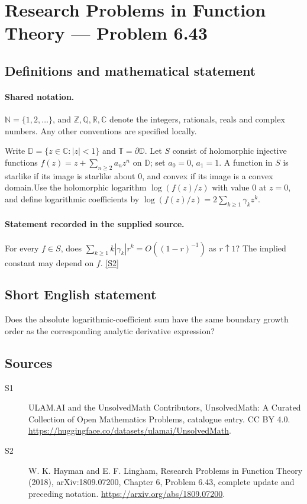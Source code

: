 \documentclass[11pt]{article}
\newcommand{\sref}[2]{\hyperlink{source:#1:#2}{[S#2]}}
\begin{document}
\section{Research Problems in Function Theory — Problem 6.43}\label{statement}

\subsection{Definitions and mathematical statement}

\paragraph{Shared notation.}$\mathbb N=\{1,2,\ldots\}$, and $\mathbb Z,\mathbb Q,\mathbb R,\mathbb C$ denote the integers, rationals, reals and complex numbers. Any other conventions are specified locally.


Write $\mathbb D=\{z\in\mathbb C:|z|<1\}$ and $\mathbb T=\partial\mathbb D$. Let $S$ consist of holomorphic injective functions $f(z)=z+\sum_{n\ge2}a_nz^n$ on $\mathbb D$; set $a_0=0$, $a_1=1$. A function in $S$ is starlike if its image is starlike about $0$, and convex if its image is a convex domain.Use the holomorphic logarithm $\log(f(z)/z)$ with value $0$ at $z=0$, and define logarithmic coefficients by $\log(f(z)/z)=2\sum_{k\ge1}\gamma_kz^k$.
\paragraph{Statement recorded in the supplied source.}
For every $f\in S$, does $\sum_{k\ge1}k|\gamma_k|r^k=O((1-r)^{-1})$ as $r\uparrow1$? The implied constant may depend on $f$. \sref{statement}{2}
\subsection{Short English statement}
Does the absolute logarithmic-coefficient sum have the same boundary growth order as the corresponding analytic derivative expression?
\subsection{Sources}
\begin{description}
\item[\hypertarget{source:statement:1}{S1}] ULAM.AI and the UnsolvedMath Contributors, UnsolvedMath: A Curated Collection of Open Mathematics Problems, catalogue entry. CC BY 4.0. \url{https://huggingface.co/datasets/ulamai/UnsolvedMath}.
\item[\hypertarget{source:statement:2}{S2}] W. K. Hayman and E. F. Lingham, Research Problems in Function Theory (2018), arXiv:1809.07200, Chapter 6, Problem 6.43, complete update and preceding notation. \url{https://arxiv.org/abs/1809.07200}.
\end{description}
\label{end:statement}
\end{document}
